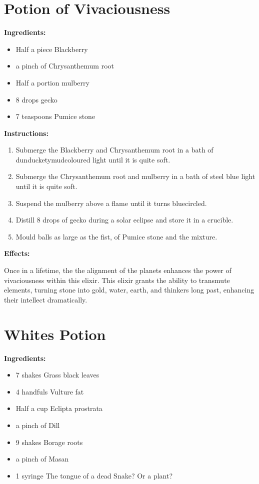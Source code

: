 \documentclass{article}
\begin{document}
\newpage
\section*{Potion of Vivaciousness}

\textbf{Ingredients:}

\begin{itemize}
  \item Half a piece Blackberry
  \item a pinch of Chrysanthemum root
  \item Half a portion mulberry
  \item 8 drops gecko
  \item 7 teaspoons Pumice stone
\end{itemize}

\textbf{Instructions:}

\begin{enumerate}
  \item Submerge the Blackberry and Chrysanthemum root in a bath of dunducketymudcoloured light until it is quite soft.
  \item Submerge the Chrysanthemum root and mulberry in a bath of steel blue light until it is quite soft.
  \item Suspend the mulberry above a flame until it turns bluecircled.
  \item Distill 8 drops of gecko during a solar eclipse and store it in a crucible.
  \item Mould balls as large as the fist, of Pumice stone and the mixture.
\end{enumerate}

\textbf{Effects:}

Once in a lifetime, the the alignment of the planets enhances the power of vivaciousness within this elixir. This elixir grants the ability to transmute elements, turning stone into gold, water, earth, and thinkers long past, enhancing their intellect dramatically.

\newpage
\section*{Whites Potion}

\textbf{Ingredients:}

\begin{itemize}
  \item 7 shakes Grass black leaves
  \item 4 handfuls Vulture fat
  \item Half a cup Eclipta prostrata
  \item a pinch of Dill
  \item 9 shakes Borage roots
  \item a pinch of Masan
  \item 1 syringe The tongue of a dead Snake? Or a plant?
\end{itemize}
\end{document}
